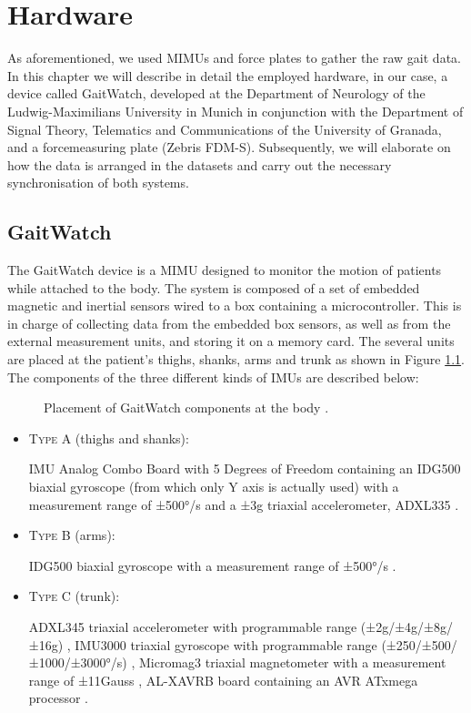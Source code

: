\chapter{Hardware}
\label{ch:Hardware}

As aforementioned, we used MIMUs and force plates to gather the raw gait data. In this chapter we will describe in detail the employed hardware, in our case, a device called GaitWatch, developed at the Department of Neurology of the Ludwig-Maximilians University in Munich in conjunction with the Department of Signal Theory, Telematics and Communications of the University of Granada, and a forcemeasuring plate (Zebris FDM-S). Subsequently, we will elaborate on how the data is arranged in the datasets and carry out the necessary synchronisation of both systems.

\section{GaitWatch}

The GaitWatch device is a MIMU designed to monitor the motion of patients while attached to the body. The system is composed of a set of embedded magnetic and inertial sensors wired to a box containing a microcontroller. This is in charge of collecting data from the embedded box sensors, as well as from the external measurement units, and storing it on a memory card. The several units are placed at the patient's thighs, shanks, arms and trunk as shown in Figure \ref{fig:GaitWatch_placement}. The components of the three different kinds of IMUs are described below:

\begin{figure}
	\centering
	\caption{Placement of GaitWatch components at the body \cite{olivares_vicente_gaitwatch_2013}.}
	\label{fig:GaitWatch_placement}
\end{figure}

\begin{itemize}

\item \textsc{Type A} (thighs and shanks): 

IMU Analog Combo Board with 5 Degrees of Freedom \cite{IMU5} containing an IDG500 biaxial gyroscope (from which only Y axis is actually used) with a measurement range of ±500°/s \cite{IDG500} and a ±3g triaxial accelerometer, ADXL335 \cite{ADXL335}.

\item \textsc{Type B} (arms):

IDG500 biaxial gyroscope with a measurement range of ±500°/s \cite{IDG500}.

\item \textsc{Type C} (trunk):

ADXL345 triaxial accelerometer with programmable range (±2g/±4g/±8g/±16g) \cite{ADXL345},
IMU3000 triaxial gyroscope with programmable range (±250/±500/±1000/±3000°/s) \cite{IMU3000}, 
Micromag3 triaxial magnetometer with a measurement range of ±11Gauss \cite{MicroMag3}, AL-XAVRB board containing an AVR ATxmega processor \cite{AVRATxmega}.

\end{itemize}


